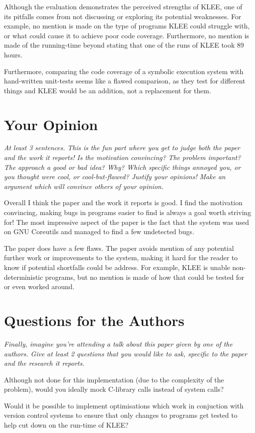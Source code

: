 \documentclass[11pt]{article}
\begin{document}
Although the evaluation demonstrates the perceived strengths of KLEE, one of
its pitfalls comes from not discussing or exploring its potential weaknesses.
For example, no mention is made on the type of programs KLEE could struggle
with, or what could cause it to achieve poor code coverage. Furthermore, no
mention is made of the running-time beyond stating that one of the runs of KLEE
took 89 hours.

Furthermore, comparing the code coverage of a symbolic execution system with
hand-written unit-tests seems like a flawed comparison, as they test for
different things and KLEE would be an addition, not a replacement for them.

\section*{Your Opinion}

\textsl{At least 3 sentences. This is the fun part where you get to judge both
the paper and the work it reports! Is the motivation convincing? The problem
important? The approach a good or bad idea? Why? Which specific things annoyed
you, or you thought were cool, or cool-but-flawed? Justify your opinions! Make
an argument which will convince others of your opinion.}

Overall I think the paper and the work it reports is good. I find the
motivation convincing, making bugs in programs easier to find is always a goal
worth striving for! The most impressive aspect of the paper is the fact that
the system was used on GNU Coreutils and managed to find a few undetected bugs.

The paper does have a few flaws. The paper avoids mention of any potential
further work or improvements to the system, making it hard for the reader to
know if potential shortfalls could be address. For example, KLEE is unable
non-deterministic programs, but no mention is made of how that could be tested
for or even worked around.

\section*{Questions for the Authors}

\textsl{Finally, imagine you're attending a talk about this paper given by one
of the authors. Give at least 2 questions that you would like to ask, specific
to the paper and the research it reports.}

Although not done for this implementation (due to the complexity of the
problem), would you ideally mock C-library calls instead of system calls?

Would it be possible to implement optimisations which work in conjuction with
version control systems to ensure that only changes to programs get tested to
help cut down on the run-time of KLEE?




\end{document}

